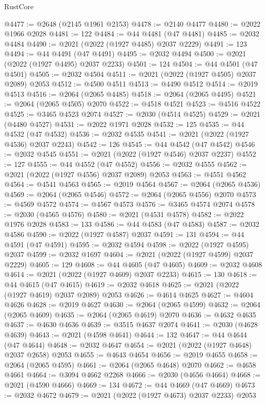 \begin{lexlean}{RustCore}
\begin{coremodule}
@4477 := @2648 (@2145 @1961 @2153)
@4478 := @2140 @4477
@4480 := @2022 @1966 @2028
@4481 := 122
@4484 := @44 @4481 (@47 @4481)
@4485 := @2032 @4484
@4490 := @2021 (@2022 (@1927 @4485) @2037 @2229)
@4491 := 123
@4494 := @44 @4491 (@47 @4491)
@4495 := @2032 @4494
@4500 := @2021 (@2022 (@1927 @4495) @2037 @2233)
@4501 := 124
@4504 := @44 @4501 (@47 @4501)
@4505 := @2032 @4504
@4511 := @2021 (@2022 (@1927 @4505) @2037 @2089) @2053
@4512 := @4500 @4511
@4513 := @4490 @4512
@4514 := @2019 @4513
@4516 := @2064 (@2065 @4485)
@4518 := @2064 (@2065 @4495)
@4521 := @2064 (@2065 @4505) @2070
@4522 := @4518 @4521
@4523 := @4516 @4522
@4525 := @3465 @4523 @2074
@4527 := @2030 (@4514 @4525)
@4529 := @2021 (@4480 @4527)
@4531 := @2022 @1971 @2028
@4532 := 125
@4535 := @44 @4532 (@47 @4532)
@4536 := @2032 @4535
@4541 := @2021 (@2022 (@1927 @4536) @2037 @2243)
@4542 := 126
@4545 := @44 @4542 (@47 @4542)
@4546 := @2032 @4545
@4551 := @2021 (@2022 (@1927 @4546) @2037 @2237)
@4552 := 127
@4555 := @44 @4552 (@47 @4552)
@4556 := @2032 @4555
@4562 := @2021 (@2022 (@1927 @4556) @2037 @2089) @2053
@4563 := @4551 @4562
@4564 := @4541 @4563
@4565 := @2019 @4564
@4567 := @2064 (@2065 @4536)
@4569 := @2064 (@2065 @4546)
@4572 := @2064 (@2065 @4556) @2070
@4573 := @4569 @4572
@4574 := @4567 @4573
@4576 := @3465 @4574 @2074
@4578 := @2030 (@4565 @4576)
@4580 := @2021 (@4531 @4578)
@4582 := @2022 @1976 @2028
@4583 := 133
@4586 := @44 @4583 (@47 @4583)
@4587 := @2032 @4586
@4590 := @2022 (@1927 @4587) @2037
@4591 := 131
@4594 := @44 @4591 (@47 @4591)
@4595 := @2032 @4594
@4598 := @2022 (@1927 @4595) @2037
@4599 := @2032 @1697
@4604 := @2021 (@2022 (@1927 @4599) @2037 @2229)
@4605 := 129
@4608 := @44 @4605 (@47 @4605)
@4609 := @2032 @4608
@4614 := @2021 (@2022 (@1927 @4609) @2037 @2233)
@4615 := 130
@4618 := @44 @4615 (@47 @4615)
@4619 := @2032 @4618
@4625 := @2021 (@2022 (@1927 @4619) @2037 @2089) @2053
@4626 := @4614 @4625
@4627 := @4604 @4626
@4628 := @2019 @4627
@4630 := @2064 (@2065 @4599)
@4632 := @2064 (@2065 @4609)
@4635 := @2064 (@2065 @4619) @2070
@4636 := @4632 @4635
@4637 := @4630 @4636
@4639 := @3515 @4637 @2074
@4641 := @2030 (@4628 @4639)
@4643 := @2021 (@4598 @4641)
@4644 := 132
@4647 := @44 @4644 (@47 @4644)
@4648 := @2032 @4647
@4654 := @2021 (@2022 (@1927 @4648) @2037 @2658) @2053
@4655 := @4643 @4654
@4656 := @2019 @4655
@4658 := @2064 (@2065 @4595)
@4661 := @2064 (@2065 @4648) @2070
@4662 := @4658 @4661
@4664 := @3094 @4662 @2268
@4666 := @2030 (@4656 @4664)
@4668 := @2021 (@4590 @4666)
@4669 := 134
@4672 := @44 @4669 (@47 @4669)
@4673 := @2032 @4672
@4679 := @2021 (@2022 (@1927 @4673) @2037 @2233) @2053

\end{coremodule}
\end{lexlean}
